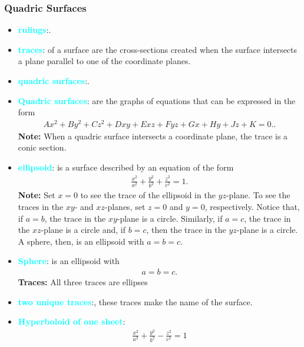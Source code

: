 \documentclass{report}
\begin{document}
    \subsubsection{Quadric Surfaces}
    \begin{itemize}
    \item \textbf{\textcolor{cyan}{rulings}}:.
    \item \textbf{\textcolor{cyan}{traces}}: of a surface are the cross-sections created when the surface intersects a plane parallel to one of the coordinate planes.
    \item \textbf{\textcolor{cyan}{quadric surfaces}}:.
    \item \textbf{\textcolor{cyan}{Quadric surfaces}}: are the graphs of equations that can be expressed in the form
        \begin{align*}
            Ax^2 + By^2 + Cz^2 + Dxy + Exz + Fyz + Gx + Hy + Jz + K = 0.
        .\end{align*}
        \textbf{Note:} When a quadric surface intersects a coordinate plane, the trace is a conic section.
    \item \textbf{\textcolor{cyan}{ellipsoid}}: is a surface described by an equation of the form
        \begin{align*}
            \frac{x^{2}}{a^{2}} + \frac{y^{2}}{b^{2}} + \frac{z^{2}}{c^{2}} = 1
        .\end{align*}
        \textbf{Note:} Set $x=0$ to see the trace of the ellipsoid in the $yz$-plane. To see the traces in the $xy$- and $xz$-planes, set $z=0$ and $y=0$, respectively. Notice that, if $a=b$, the trace in the $xy$-plane is a circle. Similarly, if $a=c$, the trace in the $xz$-plane is a circle and, if $b=c$, then the trace in the $yz$-plane is a circle. A sphere, then, is an ellipsoid with $a=b=c$.
        \bigbreak \noindent 
    \item \textbf{\textcolor{cyan}{Sphere}}: is an ellipsoid with
        \begin{align*}
            a=b=c
        .\end{align*}
        \textbf{Traces:} All three traces are ellipses
    \item \textbf{\textcolor{cyan}{two unique traces}}:, these traces make the name of the surface.
    \item \textbf{\textcolor{cyan}{Hyperboloid of one sheet}}:
        \begin{align*}
            \frac{x^{2}}{a^{2}} + \frac{y^{2}}{b^{2}} - \frac{z^{2}}{c^{2}} = 1

\end{align*}
\end{itemize}
\end{document}
